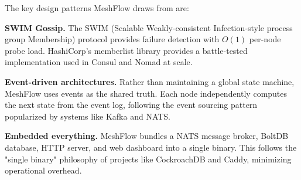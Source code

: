 The key design patterns MeshFlow draws from are:

\textbf{SWIM Gossip.} The SWIM (Scalable Weakly-consistent Infection-style process group Membership) protocol provides failure detection with $O(1)$ per-node probe load. HashiCorp's memberlist library provides a battle-tested implementation used in Consul and Nomad at scale.

\textbf{Event-driven architectures.} Rather than maintaining a global state machine, MeshFlow uses events as the shared truth. Each node independently computes the next state from the event log, following the event sourcing pattern popularized by systems like Kafka and NATS.

\textbf{Embedded everything.} MeshFlow bundles a NATS message broker, BoltDB database, HTTP server, and web dashboard into a single binary. This follows the "single binary" philosophy of projects like CockroachDB and Caddy, minimizing operational overhead.
